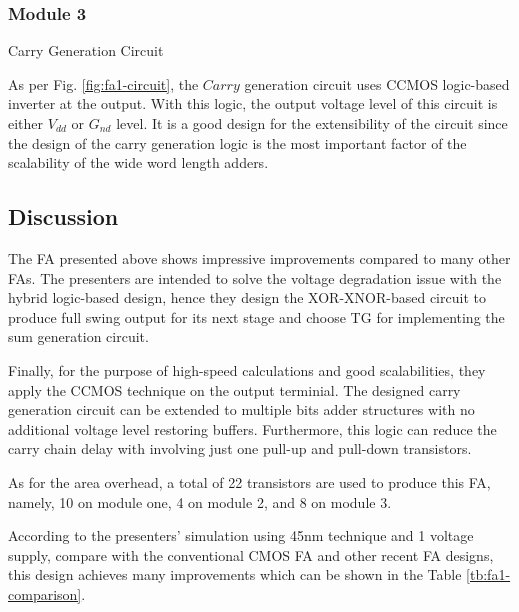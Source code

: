 \documentclass[conference]{IEEEtran}
\begin{document}
\subsubsection{Module 3}Carry Generation Circuit

As per Fig. \ref{fig:fa1-circuit}, the \(Carry\) generation circuit uses CCMOS logic-based inverter at the output.
With this logic, the output voltage level of this circuit is either \(V_{dd}\) or \(G_{nd}\) level.
It is a good design for the extensibility of the circuit
since the design of the carry generation logic is the most important factor of the scalability of the wide word length adders.


\subsection{Discussion}

The FA presented above shows impressive improvements compared to many other FAs.
The presenters are intended to solve the voltage degradation issue with the hybrid logic-based design,
hence they design the XOR-XNOR-based circuit to produce full swing output for its next stage
and choose TG for implementing the sum generation circuit.

Finally, for the purpose of high-speed calculations and good scalabilities,
they apply the CCMOS technique on the output terminial.
The designed carry generation circuit can be extended to multiple bits adder structures with no additional voltage level restoring buffers.
Furthermore, this logic can reduce the carry chain delay with involving just one pull-up and pull-down transistors.

As for the area overhead, a total of 22 transistors are used to produce this FA, namely, 10 on module one, 4 on module 2, and 8 on module 3.

According to the presenters' simulation using 45nm technique and 1 voltage supply, compare with the conventional CMOS FA and other recent FA designs,
this design achieves many improvements which can be shown in the Table \ref{tb:fa1-comparison}.
\end{document}
